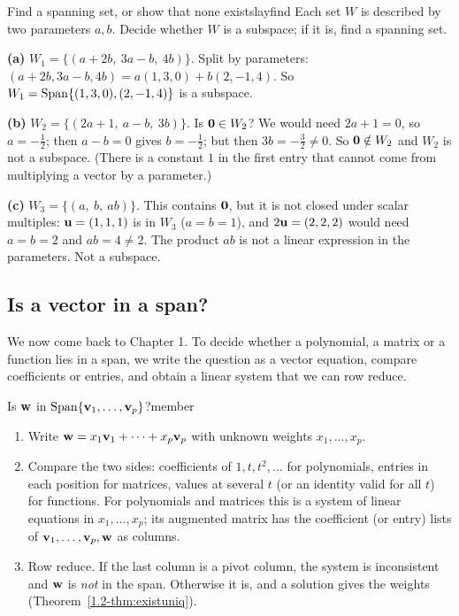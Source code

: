 \documentclass[11pt]{article}
\begin{document}
\begin{exmp}{Find a spanning set, or show that none exists}{layfind}
Each set $W$ is described by two parameters $a,b$. Decide whether $W$ is a subspace; if it is, find a spanning set.

\textbf{(a)} $W_1=\{(a+2b,\ 3a-b,\ 4b)\}$. Split by parameters: $(a+2b,3a-b,4b)=a(1,3,0)+b(2,-1,4)$. So $W_1=\operatorname{Span}\{(1,3,0),(2,-1,4)\}$ is a subspace.

\textbf{(b)} $W_2=\{(2a+1,\ a-b,\ 3b)\}$. Is $\mathbf{0}\in W_2$? We would need $2a+1=0$, so $a=-\tfrac12$; then $a-b=0$ gives $b=-\tfrac12$; but then $3b=-\tfrac32\neq0$. So $\mathbf{0}\notin W_2$ and $W_2$ is not a subspace. (There is a constant $1$ in the first entry that cannot come from multiplying a vector by a parameter.)

\textbf{(c)} $W_3=\{(a,\ b,\ ab)\}$. This contains $\mathbf{0}$, but it is not closed under scalar multiples: $\mathbf{u}=(1,1,1)$ is in $W_3$ ($a=b=1$), and $2\mathbf{u}=(2,2,2)$ would need $a=b=2$ and $ab=4\neq2$. The product $ab$ is not a linear expression in the parameters. Not a subspace.
\end{exmp}

\subsection*{Is a vector in a span?}

We now come back to Chapter 1. To decide whether a polynomial, a matrix or a function lies in a span, we write the question as a vector equation, compare coefficients or entries, and obtain a linear system that we can row reduce.

\begin{proc}{Is $\mathbf{w}$ in $\operatorname{Span}\{\mathbf{v}_1,\dots,\mathbf{v}_p\}$?}{member}
\begin{enumerate}
  \item Write $\mathbf{w}=x_1\mathbf{v}_1+\cdots+x_p\mathbf{v}_p$ with unknown weights $x_1,\dots,x_p$.
  \item Compare the two sides: coefficients of $1,t,t^2,\dots$ for polynomials, entries in each position for matrices, values at several $t$ (or an identity valid for all $t$) for functions. For polynomials and matrices this is a system of linear equations in $x_1,\dots,x_p$; its augmented matrix has the coefficient (or entry) lists of $\mathbf{v}_1,\dots,\mathbf{v}_p,\mathbf{w}$ as columns.
  \item Row reduce. If the last column is a pivot column, the system is inconsistent and $\mathbf{w}$ is \emph{not} in the span. Otherwise it is, and a solution gives the weights (Theorem~\ref{1.2-thm:existuniq}).
\end{enumerate}
\end{proc}
\end{document}

